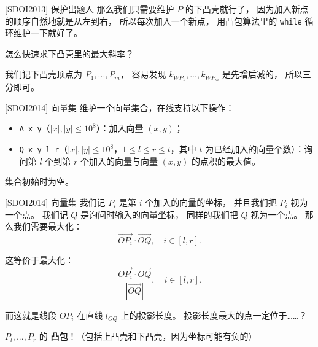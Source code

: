 \documentclass{beamer}
\begin{document}
\begin{frame}[fragile]{[SDOI2013] 保护出题人}
    \footnotesize
    那么我们只需要维护 $P$ 的下凸壳就行了，
    因为加入新点的顺序自然地就是从左到右，
    所以每次加入一个新点，
    用凸包算法里的 \verb|while| 循环维护一下就好了。

    怎么快速求下凸壳里的最大斜率？

    \vspace{1em}\pause
    我们记下凸壳顶点为 $P_1,...,P_m$，
    容易发现 $k_{WP_1},...,k_{WP_m}$ 是先增后减的，
    所以三分即可。
\end{frame}

\begin{frame}[fragile]{[SDOI2014] 向量集}
    \small
    维护一个向量集合，在线支持以下操作：

    \begin{itemize}
    \item \verb|A x y|（$|x|,|y| \le 10^8$）：加入向量 $(x,y)$；
    \item \verb|Q x y l r|（$|x|,|y| \le 10^8$，$1 \le l \le r \le t$，其中 $t$ 为已经加入的向量个数）：询问第 $l$ 个到第 $r$ 个加入的向量与向量 $(x,y)$ 的点积的最大值。
    \end{itemize}

    集合初始时为空。
\end{frame}

\begin{frame}[fragile]{[SDOI2014] 向量集}
    \small
    我们记 $P_i$ 是第 $i$ 个加入的向量的坐标，
    并且我们把 $P_i$ 视为一个点。
    我们记 $Q$ 是询问时输入的向量坐标，
    同样的我们把 $Q$ 视为一个点。
    那么我们需要最大化：
    \begin{equation}
        \overrightarrow{OP_i}\cdot \overrightarrow{OQ},\quad i\in[l,r].
    \end{equation}

    \pause 这等价于最大化：
    \begin{equation}
        \frac{\overrightarrow{OP_i}\cdot \overrightarrow{OQ}}{|\overrightarrow{OQ}|} ,\quad i\in[l,r].
    \end{equation}

    而这就是线段 $OP_i$ 在直线 $l_{OQ}$ 上的投影长度。
    投影长度最大的点一定位于……？

    \pause $P_l,...,P_r$ 的 \textbf{凸包}！（包括上凸壳和下凸壳，因为坐标可能有负的）
\end{frame}
\end{document}
